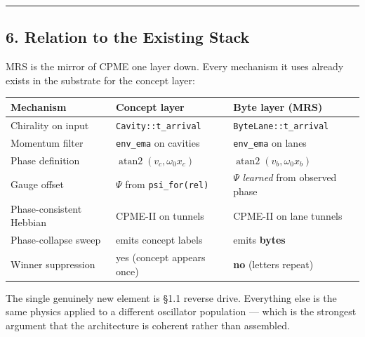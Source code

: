 \documentclass[
  11pt,
  a4paper,
]{article}
\begin{document}
\begin{center}\rule{0.5\linewidth}{0.5pt}\end{center}

\subsection{6. Relation to the Existing
Stack}\label{relation-to-the-existing-stack}

MRS is the mirror of CPME one layer down. Every mechanism it uses
already exists in the substrate for the concept layer:

\begin{longtable}[]{@{}
  >{\raggedright\arraybackslash}p{}
  >{\raggedright\arraybackslash}p{}
  >{\raggedright\arraybackslash}p{}@{}}
\toprule\noalign{}
\begin{minipage}[b]{\linewidth}\raggedright
Mechanism
\end{minipage} & \begin{minipage}[b]{\linewidth}\raggedright
Concept layer
\end{minipage} & \begin{minipage}[b]{\linewidth}\raggedright
Byte layer (MRS)
\end{minipage} \\
\midrule\noalign{}
\endhead
\bottomrule\noalign{}
\endlastfoot
Chirality on input & \texttt{Cavity::t\_arrival} &
\texttt{ByteLane::t\_arrival} \\
Momentum filter & \texttt{env\_ema} on cavities & \texttt{env\_ema} on
lanes \\
Phase definition & \(\operatorname{atan2}(v_c, \omega_0 x_c)\) &
\(\operatorname{atan2}(v_b, \omega_0 x_b)\) \\
Gauge offset & \(\Psi\) from \texttt{psi\_for(rel)} & \(\Psi\)
\emph{learned} from observed phase \\
Phase-consistent Hebbian & CPME-II on tunnels & CPME-II on lane
tunnels \\
Phase-collapse sweep & emits concept labels & emits \textbf{bytes} \\
Winner suppression & yes (concept appears once) & \textbf{no} (letters
repeat) \\
\end{longtable}

The single genuinely new element is §1.1 reverse drive. Everything else
is the same physics applied to a different oscillator population ---
which is the strongest argument that the architecture is coherent rather
than assembled.
\end{document}
